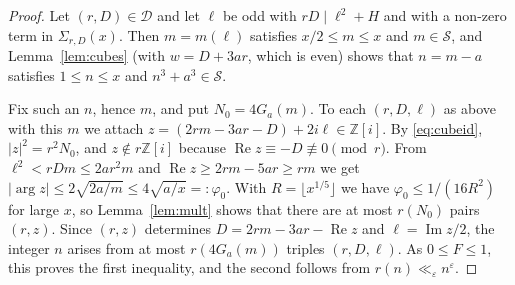 \documentclass[11pt]{amsart}
\theoremstyle{remark}
\theoremstyle{definition}
\numberwithin{equation}{section}
\newcommand{\Sc}{\mathcal{S}}
\newcommand{\Dc}{\mathcal{D}}
\newcommand{\Z}{\mathbb{Z}}
\newcommand{\eps}{\varepsilon}
\newcommand{\Zi}{\Z[i]}
\begin{document}
\begin{proof}
Let $(r,D)\in\Dc$ and let $\ell$ be odd with $rD\mid\ell^2+H$ and with a non-zero term in $\Sigma_{r,D}(x)$. Then $m=m(\ell)$ satisfies $x/2\le m\le x$ and $m\in\Sc$, and Lemma~\ref{lem:cubes} (with $w=D+3ar$, which is even) shows that $n=m-a$ satisfies $1\le n\le x$ and $n^3+a^3\in\Sc$.

Fix such an $n$, hence $m$, and put $N_0=4G_a(m)$. To each $(r,D,\ell)$ as above with this $m$ we attach $z=(2rm-3ar-D)+2i\ell\in\Zi$. By \eqref{eq:cubeid}, $|z|^2=r^2N_0$, and $z\notin r\Zi$ because $\operatorname{Re}z\equiv-D\not\equiv0\pmod r$. From $\ell^2<rDm\le2ar^2m$ and $\operatorname{Re}z\ge2rm-5ar\ge rm$ we get $|\arg z|\le2\sqrt{2a/m}\le4\sqrt{a/x}=:\varphi_0$. With $R=\lfloor x^{1/5}\rfloor$ we have $\varphi_0\le1/(16R^2)$ for large $x$, so Lemma~\ref{lem:mult} shows that there are at most $r(N_0)$ pairs $(r,z)$. Since $(r,z)$ determines $D=2rm-3ar-\operatorname{Re}z$ and $\ell=\operatorname{Im}z/2$, the integer $n$ arises from at most $r(4G_a(m))$ triples $(r,D,\ell)$. As $0\le F\le1$, this proves the first inequality, and the second follows from $r(n)\ll_\eps n^\eps$.
\end{proof}
\end{document}
